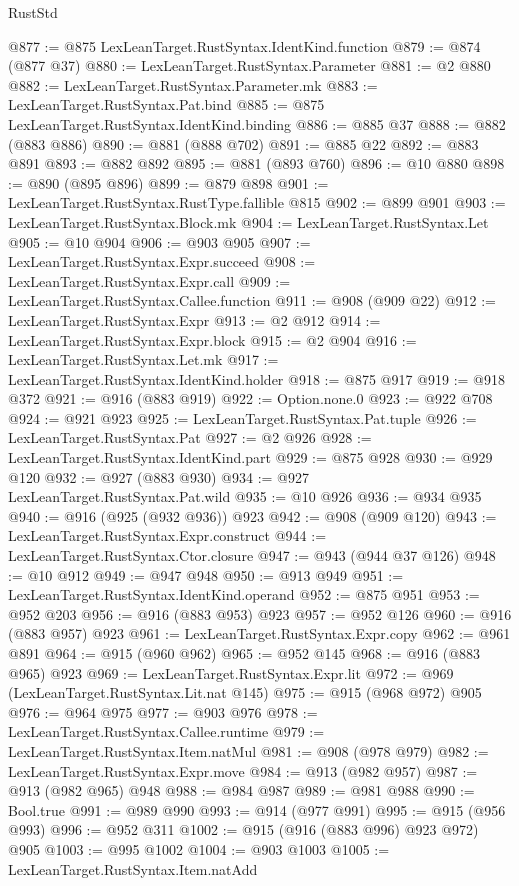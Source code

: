 \begin{lexlean}{RustStd}
\begin{coremodule}
@877 := @875 LexLeanTarget.RustSyntax.IdentKind.function
@879 := @874 (@877 @37)
@880 := LexLeanTarget.RustSyntax.Parameter
@881 := @2 @880
@882 := LexLeanTarget.RustSyntax.Parameter.mk
@883 := LexLeanTarget.RustSyntax.Pat.bind
@885 := @875 LexLeanTarget.RustSyntax.IdentKind.binding
@886 := @885 @37
@888 := @882 (@883 @886)
@890 := @881 (@888 @702)
@891 := @885 @22
@892 := @883 @891
@893 := @882 @892
@895 := @881 (@893 @760)
@896 := @10 @880
@898 := @890 (@895 @896)
@899 := @879 @898
@901 := LexLeanTarget.RustSyntax.RustType.fallible @815
@902 := @899 @901
@903 := LexLeanTarget.RustSyntax.Block.mk
@904 := LexLeanTarget.RustSyntax.Let
@905 := @10 @904
@906 := @903 @905
@907 := LexLeanTarget.RustSyntax.Expr.succeed
@908 := LexLeanTarget.RustSyntax.Expr.call
@909 := LexLeanTarget.RustSyntax.Callee.function
@911 := @908 (@909 @22)
@912 := LexLeanTarget.RustSyntax.Expr
@913 := @2 @912
@914 := LexLeanTarget.RustSyntax.Expr.block
@915 := @2 @904
@916 := LexLeanTarget.RustSyntax.Let.mk
@917 := LexLeanTarget.RustSyntax.IdentKind.holder
@918 := @875 @917
@919 := @918 @372
@921 := @916 (@883 @919)
@922 := Option.none.{0}
@923 := @922 @708
@924 := @921 @923
@925 := LexLeanTarget.RustSyntax.Pat.tuple
@926 := LexLeanTarget.RustSyntax.Pat
@927 := @2 @926
@928 := LexLeanTarget.RustSyntax.IdentKind.part
@929 := @875 @928
@930 := @929 @120
@932 := @927 (@883 @930)
@934 := @927 LexLeanTarget.RustSyntax.Pat.wild
@935 := @10 @926
@936 := @934 @935
@940 := @916 (@925 (@932 @936)) @923
@942 := @908 (@909 @120)
@943 := LexLeanTarget.RustSyntax.Expr.construct
@944 := LexLeanTarget.RustSyntax.Ctor.closure
@947 := @943 (@944 @37 @126)
@948 := @10 @912
@949 := @947 @948
@950 := @913 @949
@951 := LexLeanTarget.RustSyntax.IdentKind.operand
@952 := @875 @951
@953 := @952 @203
@956 := @916 (@883 @953) @923
@957 := @952 @126
@960 := @916 (@883 @957) @923
@961 := LexLeanTarget.RustSyntax.Expr.copy
@962 := @961 @891
@964 := @915 (@960 @962)
@965 := @952 @145
@968 := @916 (@883 @965) @923
@969 := LexLeanTarget.RustSyntax.Expr.lit
@972 := @969 (LexLeanTarget.RustSyntax.Lit.nat @145)
@975 := @915 (@968 @972) @905
@976 := @964 @975
@977 := @903 @976
@978 := LexLeanTarget.RustSyntax.Callee.runtime
@979 := LexLeanTarget.RustSyntax.Item.natMul
@981 := @908 (@978 @979)
@982 := LexLeanTarget.RustSyntax.Expr.move
@984 := @913 (@982 @957)
@987 := @913 (@982 @965) @948
@988 := @984 @987
@989 := @981 @988
@990 := Bool.true
@991 := @989 @990
@993 := @914 (@977 @991)
@995 := @915 (@956 @993)
@996 := @952 @311
@1002 := @915 (@916 (@883 @996) @923 @972) @905
@1003 := @995 @1002
@1004 := @903 @1003
@1005 := LexLeanTarget.RustSyntax.Item.natAdd

\end{coremodule}
\end{lexlean}

